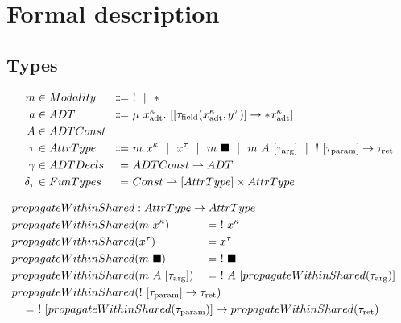 \chapter{Formal description}\label{sec:theory}

\newcommand{\sep}{\ \ |\ \ }
\newcommand{\icode}[1]{\textrm{\lstinline[language=ir-if]|#1|}}

\section{Types}
\begin{alignat*}{2}
  m &\in Modality &\Coloneqq&\ ! \sep * \\
  a &\in ADT &\Coloneqq&\ \mu\ x^\kappa_\text{adt}.\ [[\tau_\text{field}(x^\kappa_\text{adt}, y^\tau)] \to *x^\kappa_\text{adt}] \\
  A &\in \mathrlap{ADTConst} \\
  \tau &\in AttrType &\Coloneqq&\ m\ x^\kappa \sep x^\tau \sep m\ \blacksquare \sep m\ A\ [\tau_\text{arg}] \sep !\ [\tau_\text{param}] \to \tau_\text{ret} \\
  \gamma &\in ADTDecls &=&\ ADTConst \rightharpoonup ADT \\
  \delta_\tau &\in FunTypes &=&\ Const \rightharpoonup [AttrType] \times AttrType
\end{alignat*}

\begin{alignat*}{3}
  propagateWithinShared &: \mathrlap{AttrType \to AttrType} \\
  propagateWithinShared&(m\ x^\kappa) &&=\ !\ x^\kappa \\
  propagateWithinShared&(x^\tau) &&= x^\tau \\
  propagateWithinShared&(m\ \blacksquare) &&=\ !\ \blacksquare \\
  propagateWithinShared&(m\ A\ [\tau_\text{arg}]) &&=\ !\ A\ [propagateWithinShared(\tau_\text{arg})] \\
  propagateWithinShared&\mathrlap{(!\ [\tau_\text{param}] \to \tau_\text{ret})} \\
  \mathclap{\hspace{12em}= \ !\ [propagateWithinShared(\tau_\text{param})] \to propagateWithinShared(\tau_\text{ret})}
\end{alignat*}

